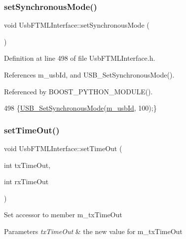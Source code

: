 \subsubsection{\texorpdfstring{set\+Synchronous\+Mode()}{setSynchronousMode()}}
{\footnotesize\ttfamily void Usb\+F\+T\+M\+L\+Interface\+::set\+Synchronous\+Mode (\begin{DoxyParamCaption}{ }\end{DoxyParamCaption})\hspace{0.3cm}{\ttfamily [inline]}}



Definition at line 498 of file Usb\+F\+T\+M\+L\+Interface.\+h.



References m\+\_\+usb\+Id, and U\+S\+B\+\_\+\+Set\+Synchronous\+Mode().



Referenced by B\+O\+O\+S\+T\+\_\+\+P\+Y\+T\+H\+O\+N\+\_\+\+M\+O\+D\+U\+L\+E().


\begin{DoxyCode}
498 \{\hyperlink{LALUsbML_8h_a33d11c5713bc41165b004b1ed3a1b408}{USB\_SetSynchronousMode}(\hyperlink{classUsbFTMLInterface_aab6754587c303660d5c498ce34a2b4c8}{m\_usbId}, 100);\}
\end{DoxyCode}
\mbox{\label{classUsbFTMLInterface_a93f8a5e14d22d36e29ffa367d60faca5}} 
\subsubsection{\texorpdfstring{set\+Time\+Out()}{setTimeOut()}}
{\footnotesize\ttfamily void Usb\+F\+T\+M\+L\+Interface\+::set\+Time\+Out (\begin{DoxyParamCaption}\item[{int}]{tx\+Time\+Out,  }\item[{int}]{rx\+Time\+Out }\end{DoxyParamCaption})\hspace{0.3cm}{\ttfamily [inline]}}

Set accessor to member m\+\_\+tx\+Time\+Out 
\begin{DoxyParams}{Parameters}
{\em tx\+Time\+Out} & the new value for m\+\_\+tx\+Time\+Out \\
\hline
\end{DoxyParams}



